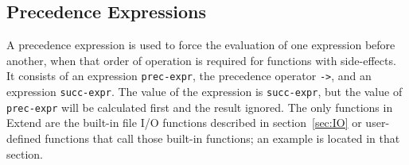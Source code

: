 \subsection{Precedence Expressions}
A precedence expression is used to force the evaluation of one expression before another, when that order of operation is required for functions with side-effects. It consists of an expression \texttt{prec-expr}, the precedence operator \texttt{->}, and an expression \texttt{succ-expr}. The value of the expression is \texttt{succ-expr}, but the value of \texttt{prec-expr} will be calculated first and the result ignored. The only functions in Extend are the built-in file I/O functions described in section~\ref{sec:IO} or user-defined functions that call those built-in functions; an example is located in that section.